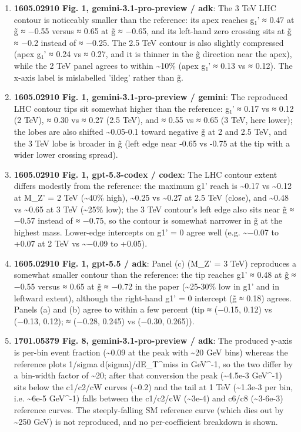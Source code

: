 \begin{enumerate}
\item \textbf{1605.02910 Fig. 1, gemini-3.1-pro-preview / adk}: The 3 TeV LHC contour is noticeably smaller than the reference: its apex reaches g₁' ≈ 0.47 at g̃ ≈ −0.55 versus ≈ 0.65 at g̃ ≈ −0.65, and its left-hand zero crossing sits at g̃ ≈ −0.2 instead of ≈ −0.25. The 2.5 TeV contour is also slightly compressed (apex g₁' ≈ 0.24 vs ≈ 0.27, and it is thinner in the g̃ direction near the apex), while the 2 TeV panel agrees to within \textasciitilde{}10\% (apex g₁' ≈ 0.13 vs ≈ 0.12). The x-axis label is mislabelled 'ildeg' rather than g̃.
\item \textbf{1605.02910 Fig. 1, gemini-3.1-pro-preview / gemini}: The reproduced LHC contour tips sit somewhat higher than the reference: g₁′ ≈ 0.17 vs ≈ 0.12 (2 TeV), ≈ 0.30 vs ≈ 0.27 (2.5 TeV), and ≈ 0.55 vs ≈ 0.65 (3 TeV, here lower); the lobes are also shifted \textasciitilde{}0.05-0.1 toward negative g̃ at 2 and 2.5 TeV, and the 3 TeV lobe is broader in g̃ (left edge near -0.65 vs -0.75 at the tip with a wider lower crossing spread).
\item \textbf{1605.02910 Fig. 1, gpt-5.3-codex / codex}: The LHC contour extent differs modestly from the reference: the maximum g1' reach is \textasciitilde{}0.17 vs \textasciitilde{}0.12 at M\_Z' = 2 TeV (\textasciitilde{}40\% high), \textasciitilde{}0.25 vs \textasciitilde{}0.27 at 2.5 TeV (close), and \textasciitilde{}0.48 vs \textasciitilde{}0.65 at 3 TeV (\textasciitilde{}25\% low); the 3 TeV contour's left edge also sits near g̃ ≈ −0.57 instead of ≈ −0.75, so the contour is somewhat narrower in g̃ at the highest mass. Lower-edge intercepts on g1' = 0 agree well (e.g. \textasciitilde{}−0.07 to +0.07 at 2 TeV vs \textasciitilde{}−0.09 to +0.05).
\item \textbf{1605.02910 Fig. 1, gpt-5.5 / adk}: Panel (c) (M\_Z' = 3 TeV) reproduces a somewhat smaller contour than the reference: the tip reaches g1' ≈ 0.48 at g̃ ≈ −0.55 versus ≈ 0.65 at g̃ ≈ −0.72 in the paper (\textasciitilde{}25-30\% low in g1' and in leftward extent), although the right-hand g1' = 0 intercept (g̃ ≈ 0.18) agrees. Panels (a) and (b) agree to within a few percent (tip ≈ (−0.15, 0.12) vs (−0.13, 0.12); ≈ (−0.28, 0.245) vs (−0.30, 0.265)).
\item \textbf{1701.05379 Fig. 8, gemini-3.1-pro-preview / adk}: The produced y-axis is per-bin event fraction (\textasciitilde{}0.09 at the peak with \textasciitilde{}20 GeV bins) whereas the reference plots 1/sigma d(sigma)/dE\_T\textasciicircum{}miss in GeV\textasciicircum{}-1, so the two differ by a bin-width factor of \textasciitilde{}20; after that conversion the peak (\textasciitilde{}4.5e-3 GeV\textasciicircum{}-1) sits below the c1/c2/cW curves (\textasciitilde{}0.2) and the tail at 1 TeV (\textasciitilde{}1.3e-3 per bin, i.e. \textasciitilde{}6e-5 GeV\textasciicircum{}-1) falls between the c1/c2/cW (\textasciitilde{}3e-4) and c6/c8 (\textasciitilde{}3-6e-3) reference curves. The steeply-falling SM reference curve (which dies out by \textasciitilde{}250 GeV) is not reproduced, and no per-coefficient breakdown is shown.

\end{enumerate}
